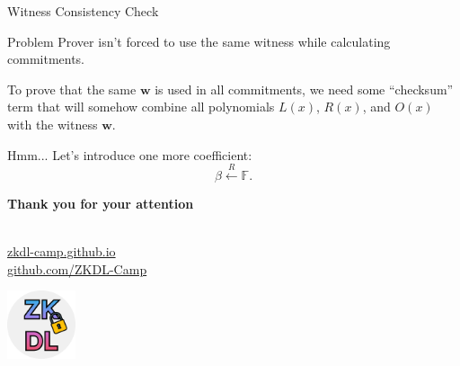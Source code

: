 \documentclass{zkdl-presentation-template}
\begin{document}
    \begin{frame}{Witness Consistency Check}
        \begin{block}{Problem}
            Prover isn't forced to use the same witness while calculating commitments.
        \end{block}
        
        To prove that the same $\mathbf{w}$ is used in all commitments, we need some ``checksum''
        term that will somehow combine all polynomials $L(x)$, $R(x)$, and $O(x)$ with the witness
        $\mathbf{w}$.

        \pause
        Hmm... Let's introduce one more coefficient:
        \begin{equation*}
            \beta \xleftarrow{R} \mathbb{F}.
        \end{equation*}
    \end{frame}

    \begin{frame}
        \centering
        \LARGE
        \textbf{Thank you for your attention} \\
        
        \vspace{0.2cm} \Huge {} \large \\
        
        \vspace{1cm}
  
        \href{https://zkdl-camp.github.io/}{\hspace{.325em}zkdl-camp.github.io} \\
  
        \href{https://github.com/ZKDL-Camp}{\hspace{.325em}github.com/ZKDL-Camp}
        
        \begin{center}
            \includegraphics[width=0.15\textwidth]{images/logo.png}
        \end{center}
    \end{frame}
\end{document}
